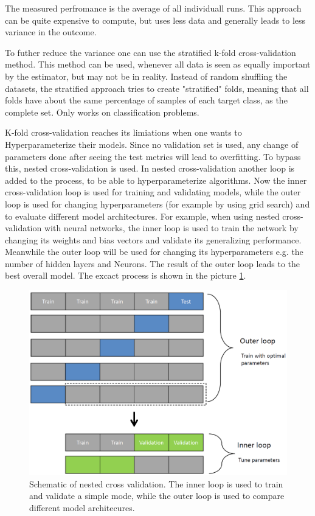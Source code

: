 \begin{questions}
The measured perfromance is the average of all individuall runs. This approach can be quite expensive to compute, but uses less data and generally leads to less variance in the outcome. 

To futher reduce the variance one can use the stratified k-fold cross-validation method. This method can be used, whenever all data is seen as equally important by the estimator, but may not be in reality. Instead of random shuffling the datasets, the stratified approach tries to create "stratified" folds, meaning that all folds have about the same percentage of samples of each target class, as the complete set. Only works on classification problems. 

K-fold cross-validation reaches its limiations when one wants to Hyperparameterize their models. Since no validation set is used, any change of parameters done after seeing the test metrics will lead to overfitting. To bypass this, nested cross-validation is used. In nested cross-validation another loop is added to the process, to be able to hyperparameterize algorithms. Now the inner cross-validation loop is used for training and validating models, while the outer loop is used for changing hyperparameters (for example by using grid search) and to evaluate different model architectures. For example, when using nested cross-validation with neural networks, the inner loop is used to train the network by changing its weights and bias vectors and validate its generalizing performance. Meanwhile the outer loop will be used for changing its hyperparameters e.g. the number of hidden layers and Neurons. The result of the outer loop leads to the best overall model. The excact process is shown in the picture \ref{fig:ncv}.

\begin{figure}[H]
	\includegraphics[width=0.8\linewidth]{pictures/nested_cross_validation.png}
	\centering
	\caption{Schematic of nested cross validation. The inner loop is used to train and validate a simple mode, while the outer loop is used to compare different model architecures.}
	\label{fig:ncv}
\end{figure}

\begin{answer}
\end{answer}

\end{questions}
